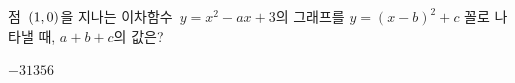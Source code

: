 점~$(1{,}\mkern3mu 0)$을 지나는 이차함수~$y=x^2-ax+3$의 그래프를 $y=(x-b)^2+c$ 꼴로 나타낼 때, $a+b+c$의 값은? 
\begin{choices32}{$-3$}{$1$}{$3$}{$5$}{$6$}\end{choices32}
